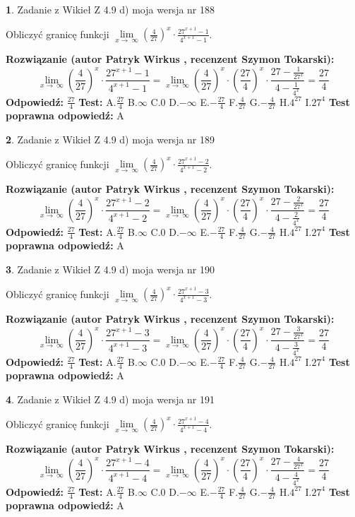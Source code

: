 \documentclass[12pt, a4paper]{article}
\theoremstyle{definition} %
\newtheorem{zad}{}
\newcommand{\zadStart}[1]{\begin{zad}#1\newline}
\newcommand{\zadStop}{\end{zad}}
\newcommand{\rozwStart}[2]{\noindent \textbf{Rozwiązanie (autor #1 , recenzent #2): }\newline}
\newcommand{\rozwStop}{\newline}
\newcommand{\odpStart}{\noindent \textbf{Odpowiedź:}\newline}
\newcommand{\odpStop}{\newline}
\newcommand{\testStart}{\noindent \textbf{Test:}\newline}
\newcommand{\testStop}{\newline}
\newcommand{\kluczStart}{\noindent \textbf{Test poprawna odpowiedź:}\newline}
\newcommand{\kluczStop}{\newline}
\begin{document}
\zadStart{Zadanie z Wikieł Z 4.9 d) moja wersja nr 188}


Obliczyć granicę funkcji  $\lim\limits_{x\to\ \infty}(\frac{4}{27})^{x}\cdot\frac{27^{x+1}-1}{4^{x+1}-1}$.
\zadStop
\rozwStart{Patryk Wirkus}{Szymon Tokarski}
$$\lim\limits_{x\to\ \infty}(\frac{4}{27})^{x}\cdot\frac{27^{x+1}-1}{4^{x+1}-1}=\lim\limits_{x\to\ \infty}(\frac{4}{27})^{x}\cdot(\frac{27}{4})^{x} \cdot \frac{27-\frac{1}{27^{x}}}{4-\frac{1}{4^{x}}} = \frac{27}{4}$$
\rozwStop
\odpStart
$\frac{27}{4}$
\odpStop
\testStart
A.$\frac{27}{4}$ B.$\infty$ C.$0$ D.$-\infty$ E.$-\frac{27}{4}$
F.$\frac{4}{27}$ G.$-\frac{4}{27}$
H.$4^{27}$
I.$27^{4}$
\testStop
\kluczStart
A
\kluczStop



\zadStart{Zadanie z Wikieł Z 4.9 d) moja wersja nr 189}


Obliczyć granicę funkcji  $\lim\limits_{x\to\ \infty}(\frac{4}{27})^{x}\cdot\frac{27^{x+1}-2}{4^{x+1}-2}$.
\zadStop
\rozwStart{Patryk Wirkus}{Szymon Tokarski}
$$\lim\limits_{x\to\ \infty}(\frac{4}{27})^{x}\cdot\frac{27^{x+1}-2}{4^{x+1}-2}=\lim\limits_{x\to\ \infty}(\frac{4}{27})^{x}\cdot(\frac{27}{4})^{x} \cdot \frac{27-\frac{2}{27^{x}}}{4-\frac{2}{4^{x}}} = \frac{27}{4}$$
\rozwStop
\odpStart
$\frac{27}{4}$
\odpStop
\testStart
A.$\frac{27}{4}$ B.$\infty$ C.$0$ D.$-\infty$ E.$-\frac{27}{4}$
F.$\frac{4}{27}$ G.$-\frac{4}{27}$
H.$4^{27}$
I.$27^{4}$
\testStop
\kluczStart
A
\kluczStop



\zadStart{Zadanie z Wikieł Z 4.9 d) moja wersja nr 190}


Obliczyć granicę funkcji  $\lim\limits_{x\to\ \infty}(\frac{4}{27})^{x}\cdot\frac{27^{x+1}-3}{4^{x+1}-3}$.
\zadStop
\rozwStart{Patryk Wirkus}{Szymon Tokarski}
$$\lim\limits_{x\to\ \infty}(\frac{4}{27})^{x}\cdot\frac{27^{x+1}-3}{4^{x+1}-3}=\lim\limits_{x\to\ \infty}(\frac{4}{27})^{x}\cdot(\frac{27}{4})^{x} \cdot \frac{27-\frac{3}{27^{x}}}{4-\frac{3}{4^{x}}} = \frac{27}{4}$$
\rozwStop
\odpStart
$\frac{27}{4}$
\odpStop
\testStart
A.$\frac{27}{4}$ B.$\infty$ C.$0$ D.$-\infty$ E.$-\frac{27}{4}$
F.$\frac{4}{27}$ G.$-\frac{4}{27}$
H.$4^{27}$
I.$27^{4}$
\testStop
\kluczStart
A
\kluczStop



\zadStart{Zadanie z Wikieł Z 4.9 d) moja wersja nr 191}


Obliczyć granicę funkcji  $\lim\limits_{x\to\ \infty}(\frac{4}{27})^{x}\cdot\frac{27^{x+1}-4}{4^{x+1}-4}$.
\zadStop
\rozwStart{Patryk Wirkus}{Szymon Tokarski}
$$\lim\limits_{x\to\ \infty}(\frac{4}{27})^{x}\cdot\frac{27^{x+1}-4}{4^{x+1}-4}=\lim\limits_{x\to\ \infty}(\frac{4}{27})^{x}\cdot(\frac{27}{4})^{x} \cdot \frac{27-\frac{4}{27^{x}}}{4-\frac{4}{4^{x}}} = \frac{27}{4}$$
\rozwStop
\odpStart
$\frac{27}{4}$
\odpStop
\testStart
A.$\frac{27}{4}$ B.$\infty$ C.$0$ D.$-\infty$ E.$-\frac{27}{4}$
F.$\frac{4}{27}$ G.$-\frac{4}{27}$
H.$4^{27}$
I.$27^{4}$
\testStop
\kluczStart
A
\kluczStop
\end{document}
